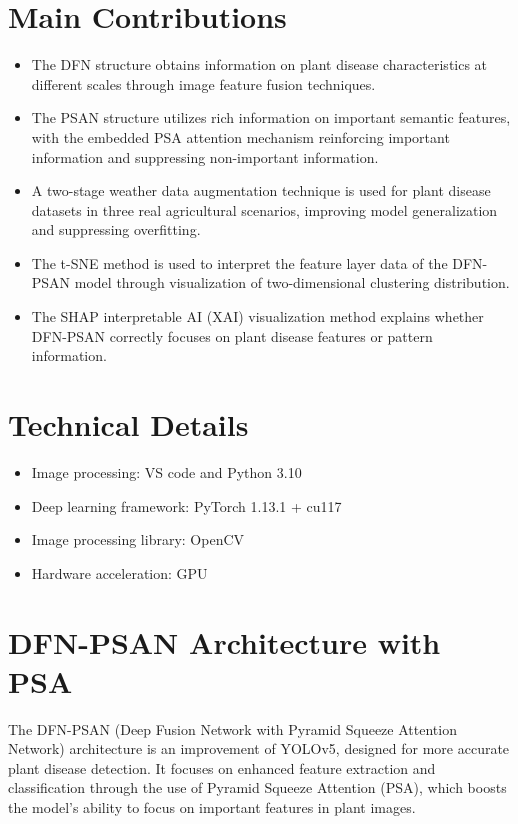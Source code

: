 \documentclass[12pt,a4paper]{article}
\begin{document}
\section{Main Contributions}
\begin{itemize}
  \item The DFN structure obtains information on plant disease characteristics at different scales through image feature fusion techniques.
  \item The PSAN structure utilizes rich information on important semantic features, with the embedded PSA attention mechanism reinforcing important information and suppressing non-important information.
  \item A two-stage weather data augmentation technique is used for plant disease datasets in three real agricultural scenarios, improving model generalization and suppressing overfitting.
  \item The t-SNE method is used to interpret the feature layer data of the DFN-PSAN model through visualization of two-dimensional clustering distribution.
  \item The SHAP interpretable AI (XAI) visualization method explains whether DFN-PSAN correctly focuses on plant disease features or pattern information.
\end{itemize}


\section{Technical Details}
\begin{itemize}
  \item Image processing: VS code and Python 3.10
  \item Deep learning framework: PyTorch 1.13.1 + cu117
  \item Image processing library: OpenCV
  \item Hardware acceleration: GPU
\end{itemize}

\section{DFN-PSAN Architecture with PSA}
The DFN-PSAN (Deep Fusion Network with Pyramid Squeeze Attention Network) architecture is an improvement of YOLOv5, designed for more accurate plant disease detection. It focuses on enhanced feature extraction and classification through the use of Pyramid Squeeze Attention (PSA), which boosts the model's ability to focus on important features in plant images.
\end{document}
